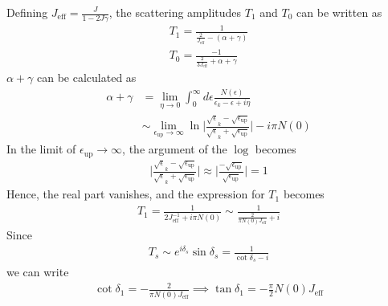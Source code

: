 Defining \(J_\text{eff} = \frac{J}{1 - 2J\gamma}\), the scattering amplitudes \(T_1\) and \(T_0\) can be written as
\begin{equation}\begin{aligned}
	T_1 = \frac{1}{\frac{2}{J_\text{eff}} - \left(\alpha + \gamma\right)}\\
T_0 = \frac{-1}{\frac{2}{3J_\text{eff}}+\alpha + \gamma}
\end{aligned}\end{equation}
\(\alpha + \gamma\) can be calculated as 
\begin{equation}\begin{aligned}
\alpha + \gamma &= \lim_{\eta \rightarrow 0}\int_0^\infty d\epsilon \frac{N(\epsilon)}{\epsilon_k - \epsilon+ i\eta} \\
        &\sim\lim_{\epsilon_\text{up} \rightarrow \infty} \ln \bigg\lvert \frac{\sqrt \epsilon_k - \sqrt{\epsilon_\text{up}}}{\sqrt \epsilon_k + \sqrt{\epsilon_\text{up}}}\bigg \rvert - i \pi N(0)
\end{aligned}\end{equation}
In the limit of \(\epsilon_\text{up} \rightarrow \infty\), the argument of the \(\log\) becomes
\begin{equation}\begin{aligned}
\bigg\lvert \frac{\sqrt \epsilon_k - \sqrt{\epsilon_\text{up}}}{\sqrt \epsilon_k + \sqrt{\epsilon_\text{up}}}\bigg \rvert \approx \bigg\lvert \frac{- \sqrt{\epsilon_\text{up}}}{\sqrt{\epsilon_\text{up}}}\bigg \rvert = 1
\end{aligned}\end{equation}
Hence, the real part vanishes, and the expression for \(T_1\) becomes
\begin{equation}\begin{aligned}
T_1 = \frac{1}{2J^{-1}_\text{eff} + i \pi N(0)} \sim \frac{1}{\frac{2}{\pi N(0)J_\text{eff}} + i}
\end{aligned}\end{equation}
Since
\begin{equation}\begin{aligned}
T_s \sim e^{i \delta_s} \sin \delta_s = \frac{1}{\cot \delta_s - i}
\end{aligned}\end{equation}
we can write
\begin{equation}\begin{aligned}
\cot \delta_1 = -\frac{2}{\pi N(0) J_\text{eff}}\implies \tan \delta_1 = -\frac{\pi}{2} N(0) J_\text{eff}
\end{aligned}\end{equation} 
